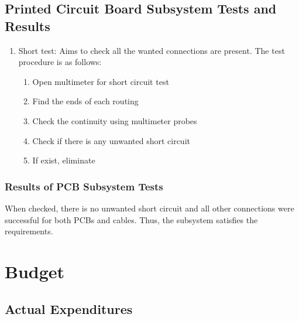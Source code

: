 \documentclass[a4paper,12pt]{article}
\begin{document}



\subsection {Printed Circuit Board Subsystem Tests and Results}

\begin{enumerate}

\item Short test: Aims to check all the wanted connections are present. The test procedure is as follows:

\begin{enumerate} 

\item Open multimeter for short circuit test  

\item Find the ends of each routing 

\item Check the continuity using multimeter probes

\item Check if there is any unwanted short circuit

\item If exist, eliminate

\end{enumerate}


\end{enumerate}

\subsubsection*{Results of PCB Subsystem Tests}
	When checked, there is no unwanted short circuit and all other connections were successful for both PCBs and cables. Thus, the subsystem satisfies the requirements.



\section{Budget}

	\subsection{Actual Expenditures}
		
\end{document}
